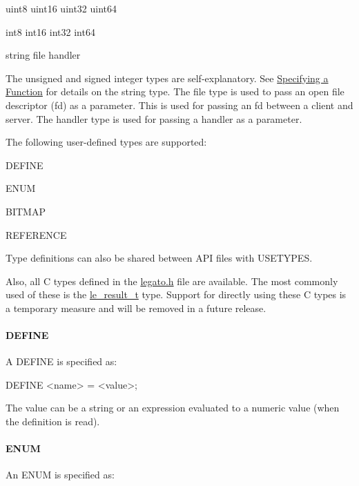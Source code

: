 \begin{DoxyVerb}uint8
uint16
uint32
uint64

int8
int16
int32
int64

string
file
handler
\end{DoxyVerb}


The unsigned and signed integer types are self-\/explanatory. See \hyperlink{interface_def_lang_syntax_interfaceDefLangSyntax_function}{Specifying a Function} for details on the {\ttfamily string} type. The {\ttfamily file} type is used to pass an open file descriptor (fd) as a parameter. This is used for passing an fd between a client and server. The {\ttfamily handler} type is used for passing a handler as a parameter.

The following user-\/defined types are supported\+:


\begin{DoxyItemize}
\item D\+E\+F\+I\+N\+E
\item E\+N\+U\+M
\item B\+I\+T\+M\+A\+P
\item R\+E\+F\+E\+R\+E\+N\+C\+E
\end{DoxyItemize}

Type definitions can also be shared between A\+P\+I files with U\+S\+E\+T\+Y\+P\+E\+S.

Also, all C types defined in the {\ttfamily \hyperlink{legato_8h}{legato.\+h}} file are available. The most commonly used of these is the \hyperlink{le__basics_8h_a1cca095ed6ebab24b57a636382a6c86c}{le\+\_\+result\+\_\+t} type. Support for directly using these C types is a temporary measure and will be removed in a future release.\hypertarget{interface_def_lang_syntax_interfaceDefLangSyntax_typesDefine}{}\paragraph{D\+E\+F\+I\+N\+E}\label{interface_def_lang_syntax_interfaceDefLangSyntax_typesDefine}
A D\+E\+F\+I\+N\+E is specified as\+:

\begin{DoxyVerb}DEFINE <name> = <value>;
\end{DoxyVerb}


The {\ttfamily value} can be a string or an expression evaluated to a numeric value (when the definition is read).\hypertarget{interface_def_lang_syntax_interfaceDefLangSyntax_typesEnum}{}\paragraph{E\+N\+U\+M}\label{interface_def_lang_syntax_interfaceDefLangSyntax_typesEnum}
An E\+N\+U\+M is specified as\+:

